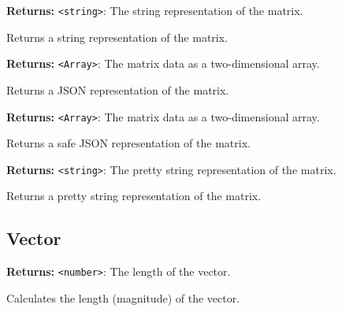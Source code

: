 \documentclass[12pt,a4paper]{article}
\begin{document}
\vspace{5mm}
\noindent {}


\noindent \textbf{Returns:} \texttt{<string>}: The string representation of the matrix.

\noindent Returns a string representation of the matrix.

\vspace{5mm}
\noindent {}


\noindent \textbf{Returns:} \texttt{<Array>}: The matrix data as a two-dimensional array.

\noindent Returns a JSON representation of the matrix.

\vspace{5mm}
\noindent {}


\noindent \textbf{Returns:} \texttt{<Array>}: The matrix data as a two-dimensional array.

\noindent Returns a safe JSON representation of the matrix.

\vspace{5mm}
\noindent {}


\noindent \textbf{Returns:} \texttt{<string>}: The pretty string representation of the matrix.

\noindent Returns a pretty string representation of the matrix.


\subsection{Vector}
\vspace{5mm}
\noindent {}


\noindent \textbf{Returns:} \texttt{<number>}: The length of the vector.

\noindent Calculates the length (magnitude) of the vector.
\end{document}
